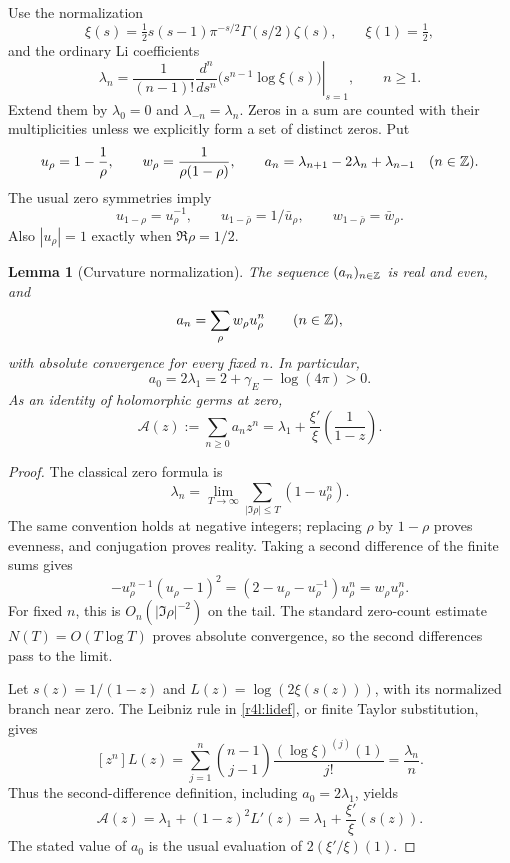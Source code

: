 \documentclass[11pt,a4paper]{article}
\newtheorem{lemma}[theorem]{Lemma}
\theoremstyle{definition}\newtheorem{definition}[theorem]{Definition}
\theoremstyle{remark}\newtheorem{remark}[theorem]{Remark}
\numberwithin{equation}{section}
\begin{document}
Use the normalization
\[
 \xi(s)=\tfrac12s(s-1)\pi^{-s/2}\Gamma(s/2)\zeta(s),
 \qquad \xi(1)=\tfrac12,
\]
and the ordinary Li coefficients
\begin{equation}\label{r4l:lidef}
 \lambda_n=\frac1{(n-1)!}
 \left.\frac{d^n}{ds^n}
     \bigl(s^{n-1}\log\xi(s)\bigr)\right|_{s=1},
 \qquad n\ge1.
\end{equation}
Extend them by $\lambda_0=0$ and $\lambda_{-n}=\lambda_n$.
Zeros in a sum are counted with their multiplicities unless we explicitly
form a set of distinct zeros.  Put
\begin{equation}\label{r4l:cayley}
 u_\rho=1-\frac1\rho,
 \qquad w_\rho=\frac1{\rho(1-\rho)},
 \qquad a_n=\lambda_{n+1}-2\lambda_n+\lambda_{n-1}
 \quad(n\in\mathbb Z).
\end{equation}
The usual zero symmetries imply
\[
 u_{1-\rho}=u_\rho^{-1},\qquad
 u_{1-\bar\rho}=1/\bar u_\rho,\qquad
 w_{1-\bar\rho}=\bar w_\rho.
\]
Also $|u_\rho|=1$ exactly when $\Re\rho=1/2$.

\begin{lemma}[Curvature normalization]\label{r4l:curvature}
The sequence $(a_n)_{n\in\mathbb Z}$ is real and even, and
\begin{equation}\label{r4l:zeromoments}
 a_n=\sum_\rho w_\rho u_\rho^n
 \qquad(n\in\mathbb Z),
\end{equation}
with absolute convergence for every fixed $n$.  In particular,
\[
 a_0=2\lambda_1=2+\gamma_E-\log(4\pi)>0.
\]
As an identity of holomorphic germs at zero,
\begin{equation}\label{r4l:generating}
 \mathcal A(z):=\sum_{n\ge0}a_nz^n
 =\lambda_1+\frac{\xi'}{\xi}\!\left(\frac1{1-z}\right).
\end{equation}
\end{lemma}
\begin{proof}
The classical zero formula is
\[
 \lambda_n=\lim_{T\to\infty}
 \sum_{|\Im\rho|\le T}(1-u_\rho^n).
\]
The same convention holds at negative integers; replacing $\rho$ by
$1-\rho$ proves evenness, and conjugation proves reality.  Taking a
second difference of the finite sums gives
\[
 -u_\rho^{n-1}(u_\rho-1)^2
 =(2-u_\rho-u_\rho^{-1})u_\rho^n
 =w_\rho u_\rho^n.
\]
For fixed $n$, this is $O_n(|\Im\rho|^{-2})$ on the tail.  The
standard zero-count estimate $N(T)=O(T\log T)$ proves absolute
convergence, so the second differences pass to the limit.

Let $s(z)=1/(1-z)$ and
$L(z)=\log(2\xi(s(z)))$, with its normalized branch near zero.
The Leibniz rule in \eqref{r4l:lidef}, or finite Taylor substitution,
gives
\[
 [z^n]L(z)
 =\sum_{j=1}^n\binom{n-1}{j-1}
       \frac{(\log\xi)^{(j)}(1)}{j!}
 =\frac{\lambda_n}{n}.
\]
Thus the second-difference definition, including $a_0=2\lambda_1$,
yields
\[
 \mathcal A(z)=\lambda_1+(1-z)^2L'(z)
 =\lambda_1+\frac{\xi'}{\xi}(s(z)).
\]
The stated value of $a_0$ is the usual evaluation of
$2(\xi'/\xi)(1)$.
\end{proof}
\end{document}
